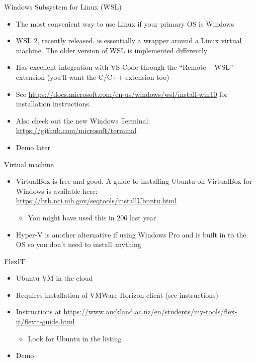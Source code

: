 \documentclass[notes]{beamer}
\begin{document}
\begin{frame}{Windows Subsystem for Linux (WSL)}
    \begin{itemize}
        \item The most convenient way to use Linux if your primary OS is Windows
        \item WSL 2, recently released, is essentially a wrapper around a Linux virtual machine. The older version of WSL is implemented differently
        \item Has excellent integration with VS Code through the ``Remote -- WSL'' extension (you'll want the C/C++ extension too)
        \item See \url{https://docs.microsoft.com/en-us/windows/wsl/install-win10} for installation instructions.
        \item Also check out the new Windows Terminal: \url{https://github.com/microsoft/terminal}
        \item Demo later
    \end{itemize}
\end{frame}
\begin{frame}{Virtual machine}
\begin{itemize}
    \item VirtualBox is free and good. A guide to installing Ubuntu on VirtualBox for Windows is available here: \url{https://brb.nci.nih.gov/seqtools/installUbuntu.html}
    \begin{itemize}
        \item You might have used this in 206 last year
    \end{itemize}
    \item Hyper-V is another alternative if using Windows Pro and is built in to the OS so you don't need to install anything
\end{itemize}
\end{frame}
\begin{frame}{FlexIT}
\begin{itemize}
    \item Ubuntu VM in the cloud
    \item Requires installation of VMWare Horizon client (see instructions)
    \item Instructions at \url{https://www.auckland.ac.nz/en/students/my-tools/flex-it/flexit-guide.html}
    \begin{itemize}
        \item Look for Ubuntu in the listing
    \end{itemize}
    \item Demo
\end{itemize}
\end{frame}
\end{document}

